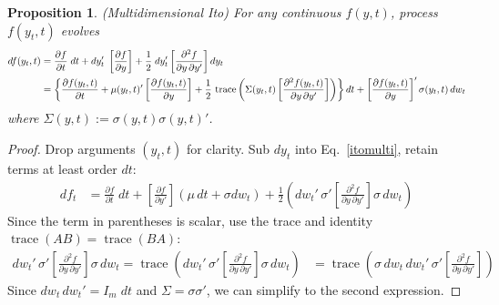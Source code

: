 \documentclass[12pt]{article}
\theoremstyle{plain}
\newtheorem{prop}[thm]{Proposition}
\theoremstyle{definition}
\theoremstyle{remark}
\newcommand{\trace}{\operatorname{trace}}
\begin{document}
\begin{prop}\emph{(Multidimensional Ito)}
For any continuous $f(y,t)$, process $f(y_t,t)$ evolves
\begin{align}
  df(y_t,t)
  &=
  \frac{\partial f}{\partial t}
  \;dt
  +
  dy_t'
  \;
  \left[
  \frac{\partial f}{\partial y}
  \right]
  +
  \frac{1}{2}\;
  dy_t'
  \left[
  \frac{\partial^2 f}{\partial y\, \partial y'}
  \right]
  dy_t
  \label{itomulti}
  \\
  &=
  \left\{
  \frac{\partial f(y_t,t)}{\partial t}
  +
  \mu(y_t,t)'
  \left[
  \frac{\partial f(y_t,t)}{\partial y}
  \right]
  +
  \frac{1}{2}\,
  \trace\left(
    \Sigma(y_t,t)
    \left[
    \frac{\partial^2 f(y_t,t)}{\partial y\,\partial y'}
    \right]
  \right)
  \right\}
  dt
  +
  \left[
  \frac{\partial f(y_t,t)}{\partial y}
  \right]'
  \sigma(y_t,t)
  \,dw_t
  \notag
\end{align}
where $\Sigma(y,t) := \sigma(y,t)\sigma(y,t)'$.
\end{prop}
\begin{proof}
Drop arguments $(y_t,t)$ for clarity.
Sub $dy_t$ into Eq.~\ref{itomulti}, retain terms
at least order $dt$:
\begin{align*}
  df_t
  &=
  \frac{\partial f}{\partial t}
  \;dt
  +
  \left[
  \frac{\partial f}{\partial y'}
  \right]
  \left(
  \mu
  \,dt
  +
  \sigma
  dw_t
  \right)
  +
  \frac{1}{2}
  \left(
  dw_t'\,
  \sigma'
  \left[
  \frac{\partial^2 f}{\partial y\,\partial y'}
  \right]
  \sigma
  \,dw_t
  \right)
\end{align*}
Since the term in parentheses is scalar, use the trace and identity
$\trace(AB)=\trace(BA)$:
\begin{align*}
  dw_t'\,
  \sigma'
  \left[
  \frac{\partial^2 f}{\partial y\,\partial y'}
  \right]
  \sigma
  \,dw_t
  =
  \trace\left(
  dw_t'\,
  \sigma'
  \left[
  \frac{\partial^2 f}{\partial y\,\partial y'}
  \right]
  \sigma
  \,dw_t
  \right)
  &=
  \trace\left(
  \sigma
  \,dw_t
  \,dw_t'
  \,\sigma'
  \left[
  \frac{\partial^2 f}{\partial y\,\partial y'}
  \right]
  \right)
\end{align*}
Since $dw_t\,dw_t'=I_m\;dt$ and $\Sigma=\sigma\sigma'$, we can simplify
to the second expression.
\end{proof}
\end{document}
